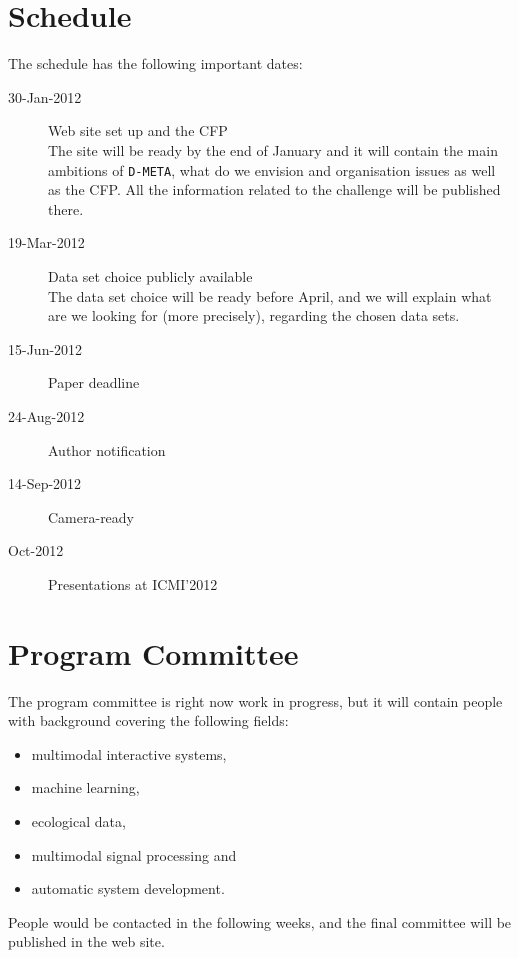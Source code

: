 \documentclass{sig-alternate}
\begin{document}
\section{Schedule}
The schedule has the following important dates:
\begin{description}
 \item[30-Jan-2012] Web site set up and the CFP\\
 The site will be ready by the end of January and it will contain the main ambitions of \texttt{D-META}, what do we
envision and organisation issues as well as the CFP. All the information related to the challenge will be published
there.
 \item[19-Mar-2012] Data set choice publicly available\\
 The data set choice will be ready before April, and we will explain what are we looking for (more precisely),
regarding the chosen data sets.
 \item[15-Jun-2012] Paper deadline
 \item[24-Aug-2012] Author notification
 \item[14-Sep-2012] Camera-ready
 \item[Oct-2012] Presentations at ICMI'2012
\end{description}

\section{Program Committee}
The program committee is right now work in progress, but it will contain people with background covering the following
fields:
\begin{itemize}
 \item multimodal interactive systems,
 \item machine learning,
 \item ecological data,
 \item multimodal signal processing and
 \item automatic system development.
\end{itemize}
People would be contacted in the following weeks, and the final committee will be published in the web site.
\end{document}
